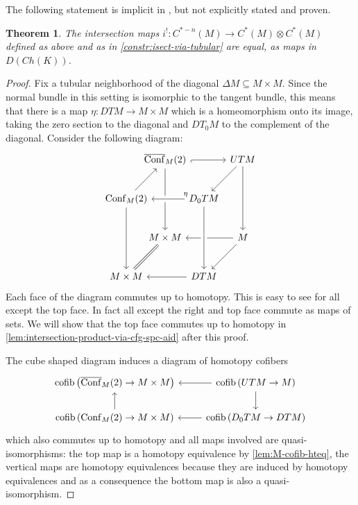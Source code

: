 \documentclass{scrartcl}
\theoremstyle{plain}
\newtheorem{theorem}{Theorem}[section]
\theoremstyle{definition}
\renewcommand{\subset}{\subseteq}
\DeclareMathOperator{\cofib}{cofib}
\DeclareMathOperator{\Conf}{Conf}
\DeclareMathOperator{\cConf}{\overline{Conf}}
\begin{document}
    
The following statement is implicit in \cite{naef2019string}, but not explicitly stated and proven. 
\begin{theorem}\label{thm:intersection-product-via-cfg-spc}
    The intersection maps $i^!\colon C^{*-n}(M) \to C^*(M)\otimes C^*(M)$ defined as above and as in \cref{constr:isect-via-tubular} are equal, as maps in $D(Ch(K))$. 
\end{theorem}
\begin{proof}
    Fix a tubular neighborhood of the diagonal $\Delta M\subset M\times M$. Since the normal bundle in this setting is isomorphic to the tangent bundle, this means that there is a map $\eta\colon DTM \to M\times M$ which is a homeomorphism onto its image, taking the zero section to the diagonal and $DT_0M$ to the complement of the diagonal. 
    Consider the following diagram:
    \[\begin{tikzcd}[row sep={40,between origins}, column sep={40,between origins}]
      & \cConf_M(2)  \ar{dd} & &   UTM  \ar{dd}\ar[ll, hookleftarrow] \ar{dl} \\
      \Conf_M(2) \ar{ur} \ar{dd} & & \ar[crossing over, ll, swap, "\eta" {xshift=18pt}] D_0TM \\
        & M\times M \ar[dl, equal] & &  M  \ar{ll}\ar{dl} \\
      M\times M && DTM \ar[from=uu,crossing over] \ar{ll}
   \end{tikzcd}\]
   Each face of the diagram commutes up to homotopy. This is easy to see for all except the top face. In fact all except the right and top face commute as maps of sets. We will show that the top face commutes up to homotopy in \cref{lem:intersection-product-via-cfg-spc-aid} after this proof. 
   
   
   The cube shaped diagram induces a diagram of homotopy cofibers
   \begin{equation}
    \begin{tikzcd}
        \cofib\left(\cConf_M(2)\to M\times M\right) & \lar \cofib\left(UTM\to M\right) \dar \\
        \cofib\left(\Conf_M(2) \to M\times M\right) \uar &\lar \cofib\left(D_0TM\to DTM\right)
    \end{tikzcd}
    \end{equation}
    which also commutes up to homotopy and all maps involved are quasi-isomorphisms: the top map is a homotopy equivalence by \cref{lem:M-cofib-hteq}, the vertical maps are homotopy equivalences because they are induced by homotopy equivalences and as a consequence the bottom map is also a quasi-isomorphism. 


\end{proof}
\end{document}
